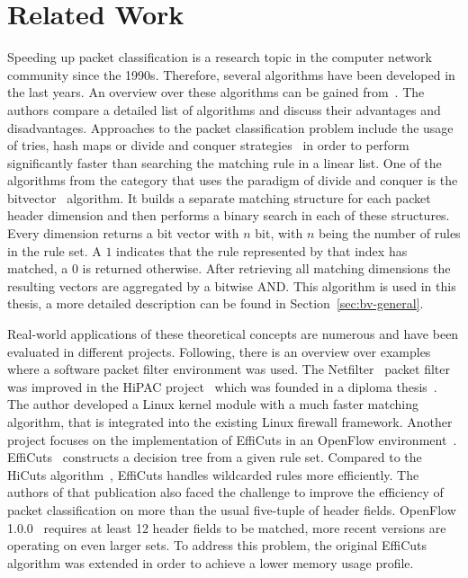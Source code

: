 \documentclass[a4paper,
		12pt,
		parskip=full,
		titlepage
		]{scrartcl}
\begin{document}
\section{Related Work}
Speeding up packet classification is a research topic in the computer network community since the 1990s.
Therefore, several algorithms have been developed in the last years.
An overview over these algorithms can be gained from~\cite{algorithms_survey}.
The authors compare a detailed list of algorithms and discuss their advantages and disadvantages.
Approaches to the packet classification problem include the usage of tries, 
hash maps or divide and conquer strategies~\cite{hicuts, efficuts} in order to perform significantly 
faster than searching the matching rule in a linear list.
One of the algorithms from the category that uses the paradigm of divide and conquer is the bitvector~\cite{bv} algorithm.
It builds a separate matching structure for each packet header dimension and 
then performs a binary search in each of these structures.
Every dimension returns a bit vector with $n$ bit, with $n$ being the number of rules in the rule set.
A $1$ indicates that the rule represented by that index has matched, a $0$ is returned otherwise.
After retrieving all matching dimensions the resulting vectors are aggregated by a bitwise AND.
This algorithm is used in this thesis, a more detailed description can be found in Section~\ref{sec:bv-general}.

Real-world applications of these theoretical concepts are numerous and have been evaluated in different projects.
Following, there is an overview over examples where a software packet filter environment was used.
The Netfilter~\cite{netfilter} packet filter was improved in the HiPAC project~\cite{hipac} 
which was founded in a diploma thesis~\cite{heinzhigh}.
The author developed a Linux kernel module with a much faster matching algorithm, 
that is integrated into the existing Linux firewall framework.
Another project focuses on the implementation of EffiCuts in an OpenFlow environment~\cite{stimpfling2013optimal}.
EffiCuts~\cite{efficuts} constructs a decision tree from a given rule set.
Compared to the HiCuts algorithm~\cite{hicuts}, EffiCuts handles wildcarded rules more efficiently.
The authors of that publication also faced the challenge to improve the efficiency 
of packet classification on more than the usual five-tuple of header fields.
OpenFlow 1.0.0~\cite{openflow_spec10} requires at least 12 header fields to 
be matched, more recent versions are operating on even larger sets.
To address this problem, the original EffiCuts algorithm was extended in order to achieve a lower memory usage profile.
\end{document}
